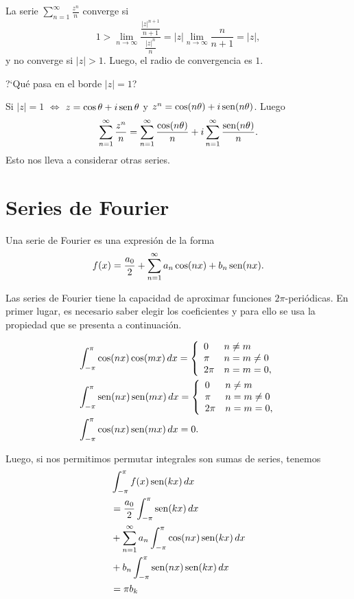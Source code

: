\begin{ejemplo}{}
La serie $\sum\limits_{n=1}^{\infty} \frac{z^n}{n}$ converge si 
\[
1>\lim\limits_{n \to \infty} \frac{\frac{|z|^{n+1}}{n+1}}{\frac{|z|^n}{n}}=
|z|\lim\limits_{n \to \infty} \frac{n }{n+1}=|z|,
\]
y no converge si $|z|>1$. Luego, el radio de convergencia es $1$.

?`Qué pasa en el borde $|z|=1$?

Si  $|z|=1$ $\Leftrightarrow$ $z=\cos \theta +i\operatorname{sen} \theta$ y $z^n=\cos(n \theta)+i \operatorname{sen}(n \theta)$. 
Luego
\[
\sum\limits_{n=1}^{\infty} \frac{z^n}{n}=
\sum\limits_{n=1}^{\infty} \frac{\cos(n \theta)}{n}+i \sum \limits_{n=1}^{\infty} \frac{\operatorname{sen} (n \theta)}{n}.
\]
Esto nos lleva a considerar otras series.
\end{ejemplo}


\section{Series de Fourier}
Una serie de Fourier es una expresión de la forma
\[
f(x)=\frac{a_0}{2}+\sum\limits_{n=1}^{\infty} a_n \cos(n x)+b_n \operatorname{sen}(nx).
\]

Las series de Fourier tiene la capacidad de aproximar funciones $2\pi$-periódicas. 
En primer lugar,   es necesario saber elegir los coeficientes y para ello se usa la propiedad que se presenta a continuación.

\begin{lema}{}
\[
\begin{split}
&\int_{-\pi}^{\pi} \cos(nx) \cos(mx)\,dx=
	\left\{
	\begin{array}{ll}
0&n\neq m
\\
\pi&n=m\neq0
\\
2\pi&n=m=0,
	\end{array}
	\right.
\\
&
\int_{-\pi}^{\pi} \operatorname{sen}(nx) \operatorname{sen}(mx)\,dx=
\left\{
\begin{array}{ll}
0&n\neq m
\\
\pi&n=m\neq0
\\
2\pi&n=m=0,
\end{array}
\right.
\\
&\int_{-\pi}^{\pi} \cos(nx) \operatorname{sen}(mx)\,dx=0.
\end{split}
\]
\end{lema}




Luego, si nos permitimos permutar integrales son sumas de series, tenemos
\[
\begin{split}
&\int_{-\pi}^{\pi} f(x)\operatorname{sen}(kx)\,dx
\\
&=\frac{a_0}{2}\int_{-\pi}^{\pi} \operatorname{sen}(kx)\,dx
\\
&+ 
\sum\limits_{n=1}^{\infty} 
a_n \int_{-\pi}^{\pi} \cos(nx)\operatorname{sen}(kx)\,dx
\\
&+
b_n \int_{-\pi}^{\pi}  \operatorname{sen}(nx) \operatorname{sen}(kx)\,dx
\\
&=\pi b_k 
\end{split}\]

